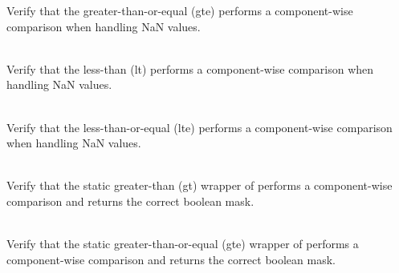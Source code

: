 \begin{DoxyRefList}
\label{test__test000053}%
%
Verify that the  greater-\/than-\/or-\/equal (gte) performs a component-\/wise comparison when handling NaN values.  
\item[{\parbox[t]{\linewidth}{Member \doxylink{group___f_g_m___vec4___l_t___comp_ga0435145d7a7fb23e428995ea416f25d6}{Vector4\+DComparison\+\_\+\+Nan\+Vector\+\_\+\+Less\+Than\+\_\+\+Returns\+Boolean\+Vector\+With\+Correct\+Values} ()}}]\hfill \\
\label{test__test000059}%
%
Verify that the  less-\/than (lt) performs a component-\/wise comparison when handling NaN values.  
\item[{\parbox[t]{\linewidth}{Member \doxylink{group___f_g_m___vec4___l_t_e___comp_gaf21f984e92f8867b0832d3e0cf5d1eb3}{Vector4\+DComparison\+\_\+\+Nan\+Vector\+\_\+\+Less\+Than\+Or\+Equal\+\_\+\+Returns\+Boolean\+Vector\+With\+Correct\+Values} ()}}]\hfill \\
\label{test__test000065}%
%
Verify that the  less-\/than-\/or-\/equal (lte) performs a component-\/wise comparison when handling NaN values.  
\item[{\parbox[t]{\linewidth}{Member \doxylink{group___f_g_m___vec4___g_t___comp_ga18b5d91f2fe8abfbbb304cfa88093993}{Vector4\+DComparison\+\_\+\+Static\+Wrapper\+\_\+\+Greater\+Than\+\_\+\+Returns\+Boolean\+Vector\+With\+Elements\+Greater\+Than\+As\+True} ()}}]\hfill \\
\label{test__test000045}%
%
Verify that the static greater-\/than (gt) wrapper of  performs a component-\/wise comparison and returns the correct boolean mask.  
\item[{\parbox[t]{\linewidth}{Member \doxylink{group___f_g_m___vec4___g_t_e___comp_ga78d194ab866842ab19e791107a9a5a18}{Vector4\+DComparison\+\_\+\+Static\+Wrapper\+\_\+\+Greater\+Than\+Or\+Equal\+\_\+\+Returns\+Boolean\+Vector\+With\+Elements\+Greater\+Than\+Or\+Equal\+As\+True} ()}}]\hfill \\
\label{test__test000051}%
%
Verify that the static greater-\/than-\/or-\/equal (gte) wrapper of  performs a component-\/wise comparison and returns the correct boolean mask.  
\item[{\parbox[t]{\linewidth}{Member \doxylink{group___f_g_m___vec4___l_t___comp_ga017497da1813cb7fb766513c6cd8d8bb}{Vector4\+DComparison\+\_\+\+Static\+Wrapper\+\_\+\+Less\+Than\+\_\+\+Returns\+Boolean\+Vector\+With\+Elements\+Less\+Than\+As\+True} ()}}]\hfill \\

\end{DoxyRefList}
